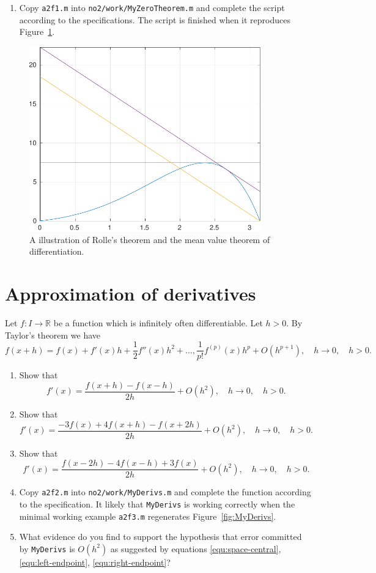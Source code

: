\documentclass[a4paper,12pt]{article}
\newcommand{\R}{\mathbb{R}}
\newcommand{\bes}{\begin{equation*}}
\newcommand{\ees}{\end{equation*}}
\newcommand{\be}{\begin{equation}}
\newcommand{\ee}{\end{equation}}
\begin{document}
  \begin{enumerate} \item
    Copy {\tt a2f1.m} into {\tt no2/work/MyZeroTheorem.m} and complete the script according to the specifications. The script is finished when it reproduces Figure~\ref{fig:MyZeroTheorems}.
  \end{enumerate}

  \begin{figure}
    \centering
    \includegraphics[width=10cm]{MyZeroTheorems.pdf} \caption[Illustration of central theorems]{A illustration of Rolle's theorem and the mean value theorem of differentiation.} \label{fig:MyZeroTheorems}
    \end{figure}

  
  \section{Approximation of derivatives}

  Let $f : I \rightarrow \R$ be a function which is infinitely often differentiable. Let $h > 0$. By Taylor's theorem we have
  \bes
  f(x + h) = f(x) + f'(x) h + \frac{1}{2} f''(x) h^2 + \dotsc, \frac{1}{p!} f^{(p)}(x) h^p + O(h^{p+1}), \quad h \rightarrow 0, \quad h > 0.
  \ees
  \begin{enumerate}
  \item Show that
    \be \label{equ:space-central}
    f'(x) = \frac{f(x+h) - f(x-h)}{2h} + O(h^2), \quad h \rightarrow 0, \quad h > 0.
    \ee
  \item Show that
    \be \label{equ:left-endpoint}
    f'(x) = \frac{-3 f(x) + 4 f(x+h) - f(x+2h)}{2h} + O(h^2), \quad  h \rightarrow 0, \quad h > 0.
    \ee
  \item Show that 
    \be \label{equ:right-endpoint}
    f'(x) = \frac{f(x-2h)-4f(x-h)+3f(x)}{2h} + O(h^2), \quad  h \rightarrow 0, \quad h > 0.
    \ee
  \item Copy {\tt a2f2.m} into {\tt no2/work/MyDerivs.m} and complete the function according to the specification. It likely that {\tt MyDerivs} is working correctly when the minimal working example {\tt a2f3.m} regenerates Figure~\ref{fig:MyDerivs}.
  \item What evidence do you find to support the hypothesis that error committed by {\tt MyDerivs} is $O(h^2)$ as suggested by equations \eqref{equ:space-central}, \eqref{equ:left-endpoint}, \eqref{equ:right-endpoint}?
 \end{enumerate}
\end{document}
